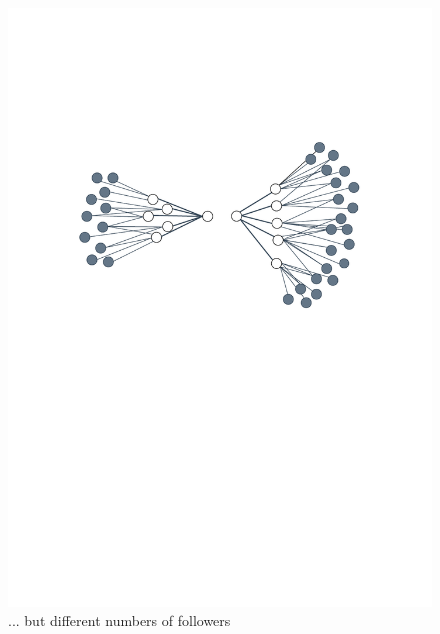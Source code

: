 \begin{figure}
\begin{center}
\begin{subtable}{1\textwidth}
        \includegraphics[scale=.6]{figures/followers/follower2}
        \caption{... but different numbers of followers}
        \label{fig:follower2}
    \end{subtable}
    \begin{subtable}{1\textwidth}
     \centering

\end{subtable}
\end{center}
\end{figure}
